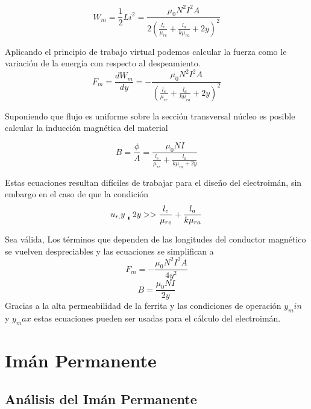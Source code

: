 \begin{equation}
	W_m = \frac{1}{2} Li^2 = \frac{\mu_0 N^2 I^2 A}{2 (\frac{l_e}{\mu_{re}}+ \frac{l_a}{k \mu_{ra}}+ 2y)^2}
\end{equation}

Aplicando el principio de trabajo virtual podemos calcular la fuerza como le variación de la energía con respecto al despeamiento.
\begin{equation}
	F_m = \frac{dW_m}{dy} = - \frac{\mu_0 N^2 I^2 A}{(\frac{l_e}{\mu_{re}}+ \frac{l_a}{k \mu_{ra}}+ 2y)^2}
\end{equation}

Suponiendo que flujo es uniforme sobre la sección transversal núcleo es posible calcular la inducción magnética del material

\begin{equation}
	B = \frac{\phi}{A} = \frac{\mu_0 NI}{\frac{l_e}{\mu_{re}}+\frac{l_a}{k \mu_{ra}+2y}}
\end{equation}

Estas ecuaciones resultan difíciles de trabajar para el diseño del electroimán, sin embargo en el caso de que la condición
\begin{equation}
	u_{r,}y \bracevert 2y >>\frac{l_e}{\mu_{re}} + \frac{l_a}{k \mu_{ra}}
\end{equation}

Sea válida, Los términos que dependen de las longitudes del conductor magnético se vuelven despreciables y las ecuaciones se simplifican a
\begin{equation}
	F_m = - \frac{\mu_0 N^2 I^2 A}{4y^2}
\end{equation}
\begin{equation}
	B = \frac{\mu_0 N I}{2y}
\end{equation}
Gracias a la alta permeabilidad de la ferrita y las condiciones de operación $y_min$   y  $y_max$ estas ecuaciones pueden ser usadas para el cálculo del electroimán.

\section{Imán Permanente}
\label{sec:related:sec3}
\subsection{Análisis del Imán Permanente}

